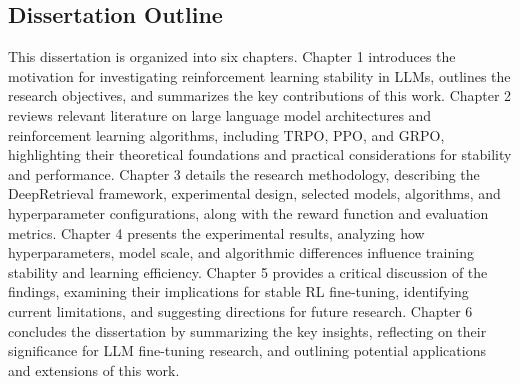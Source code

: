 \subsection{Dissertation Outline}
This dissertation is organized into six chapters.
Chapter 1 introduces the motivation for investigating reinforcement learning stability in LLMs, outlines the research objectives, and summarizes the key contributions of this work.
Chapter 2 reviews relevant literature on large language model architectures and reinforcement learning algorithms, including TRPO, PPO, and GRPO, highlighting their theoretical foundations and practical considerations for stability and performance.
Chapter 3 details the research methodology, describing the DeepRetrieval framework, experimental design, selected models, algorithms, and hyperparameter configurations, along with the reward function and evaluation metrics.
Chapter 4 presents the experimental results, analyzing how hyperparameters, model scale, and algorithmic differences influence training stability and learning efficiency.
Chapter 5 provides a critical discussion of the findings, examining their implications for stable RL fine-tuning, identifying current limitations, and suggesting directions for future research.
Chapter 6 concludes the dissertation by summarizing the key insights, reflecting on their significance for LLM fine-tuning research, and outlining potential applications and extensions of this work.